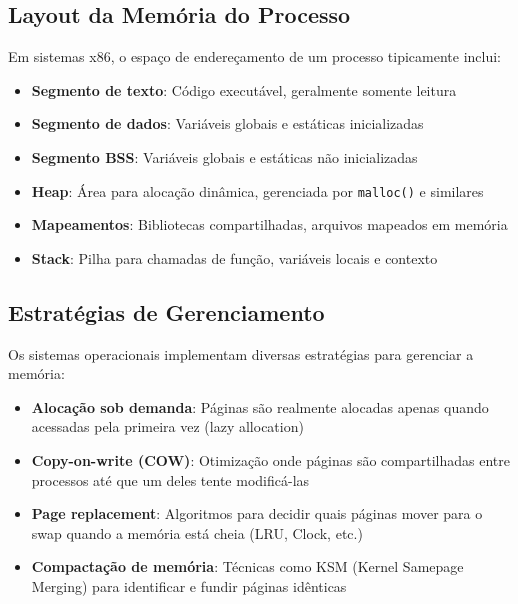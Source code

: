 \subsection{Layout da Memória do Processo}
\label{subsec:layout_memoria}

Em sistemas x86, o espaço de endereçamento de um processo tipicamente inclui:

\begin{itemize}
    \item \textbf{Segmento de texto}: Código executável, geralmente somente leitura

    \item \textbf{Segmento de dados}: Variáveis globais e estáticas inicializadas

    \item \textbf{Segmento BSS}: Variáveis globais e estáticas não inicializadas

    \item \textbf{Heap}: Área para alocação dinâmica, gerenciada por \texttt{malloc()} e similares

    \item \textbf{Mapeamentos}: Bibliotecas compartilhadas, arquivos mapeados em memória

    \item \textbf{Stack}: Pilha para chamadas de função, variáveis locais e contexto
\end{itemize}

\subsection{Estratégias de Gerenciamento}
\label{subsec:estrategias}

Os sistemas operacionais implementam diversas estratégias para gerenciar a memória:

\begin{itemize}
    \item \textbf{Alocação sob demanda}: Páginas são realmente alocadas apenas quando acessadas pela primeira vez (lazy allocation)

    \item \textbf{Copy-on-write (COW)}: Otimização onde páginas são compartilhadas entre processos até que um deles tente modificá-las

    \item \textbf{Page replacement}: Algoritmos para decidir quais páginas mover para o swap quando a memória está cheia (LRU, Clock, etc.)

    \item \textbf{Compactação de memória}: Técnicas como KSM (Kernel Samepage Merging) para identificar e fundir páginas idênticas
\end{itemize}


